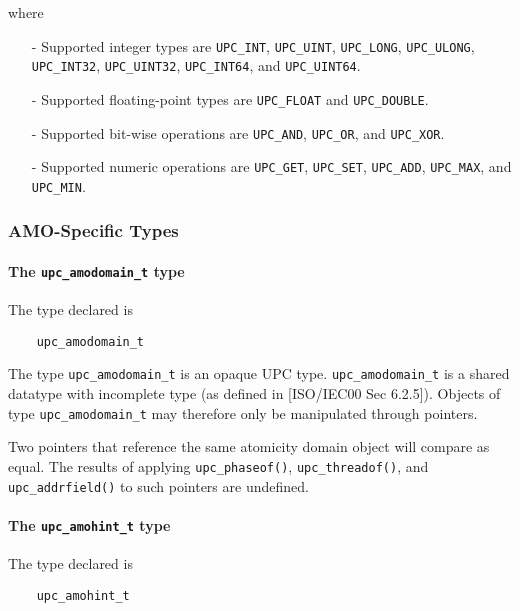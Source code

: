     where
\begin{itemize}
  \item[-] Supported integer types are {\tt UPC\_INT}, {\tt UPC\_UINT},
    {\tt UPC\_LONG}, {\tt UPC\_ULONG}, {\tt UPC\_INT32}, {\tt UPC\_UINT32},
    {\tt UPC\_INT64}, and {\tt UPC\_UINT64}.
  \item[-] Supported floating-point types are {\tt UPC\_FLOAT} and
    {\tt UPC\_DOUBLE}.
  \item[-] Supported bit-wise operations are {\tt UPC\_AND}, {\tt UPC\_OR},
    and {\tt UPC\_XOR}.
  \item[-] Supported numeric operations are {\tt UPC\_GET}, {\tt UPC\_SET},
    {\tt UPC\_ADD}, {\tt UPC\_MAX}, and {\tt UPC\_MIN}.
\end{itemize}

\subsubsection{AMO-Specific Types}
\label{upc-amo-types}

\paragraph{The {\tt upc\_amodomain\_t} type}

\npf The type declared is
\begin{verbatim}
    upc_amodomain_t
\end{verbatim}

\np The type {\tt upc\_amodomain\_t} is an opaque UPC type.
    {\tt upc\_amodomain\_t} is a shared datatype with incomplete type (as 
    defined in [ISO/IEC00 Sec 6.2.5]).  Objects of type {\tt upc\_amodomain\_t}
    may therefore only be manipulated through pointers.

\np Two pointers that reference the same atomicity domain object will compare
    as equal.  The results of applying {\tt upc\_phaseof()},
    {\tt upc\_threadof()}, and {\tt upc\_addrfield()} to such pointers are
    undefined.

\paragraph{The {\tt upc\_amohint\_t} type}

\npf The type declared is
\begin{verbatim}
    upc_amohint_t
\end{verbatim}


